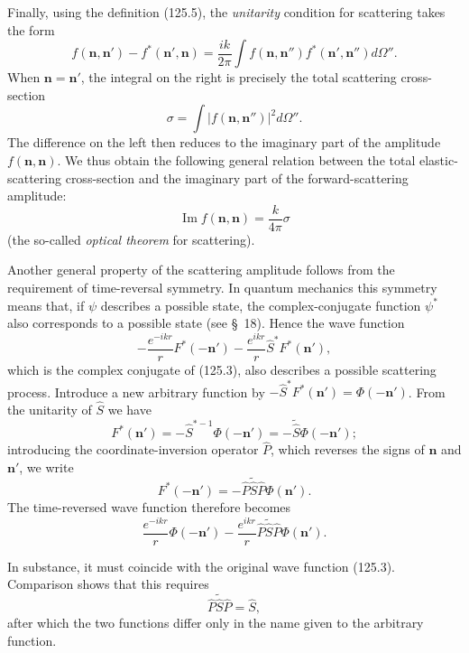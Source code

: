 Finally, using the definition (125.5), the \emph{unitarity} condition for
scattering takes the form
\begin{equation}
 f(\mathbf n,\mathbf n')-f^*(\mathbf n',\mathbf n)
 =\frac{ik}{2\pi}\int f(\mathbf n,\mathbf n'')
 f^*(\mathbf n',\mathbf n'')d\Omega''.
 \tag{125.8}
\end{equation}
When $\mathbf n=\mathbf n'$, the integral on the right is precisely the total
scattering cross-section
\[
 \sigma=\int|f(\mathbf n,\mathbf n'')|^2d\Omega''.
\]
The difference on the left then reduces to the imaginary part of the
amplitude $f(\mathbf n,\mathbf n)$. We thus obtain the following general
relation between the total elastic-scattering cross-section and the imaginary
part of the forward-scattering amplitude:
\begin{equation}
 \operatorname{Im}f(\mathbf n,\mathbf n)=\frac{k}{4\pi}\sigma
 \tag{125.9}
\end{equation}
(the so-called \emph{optical theorem} for scattering).

Another general property of the scattering amplitude follows from the
requirement of time-reversal symmetry. In quantum mechanics this symmetry
means that, if $\psi$ describes a possible state, the complex-conjugate
function $\psi^*$ also corresponds to a possible state (see \S~18). Hence the
wave function
\[
 -\frac{e^{-ikr}}rF^*(-\mathbf n')
 -\frac{e^{ikr}}r\hat S^*F^*(\mathbf n'),
\]
which is the complex conjugate of (125.3), also describes a possible
scattering process. Introduce a new arbitrary function by
$-\hat S^*F^*(\mathbf n')=\Phi(-\mathbf n')$. From the unitarity of $\hat S$
we have
\[
 F^*(\mathbf n')=-\hat S^{*-1}\Phi(-\mathbf n')=-\widetilde{\hat S}
 \Phi(-\mathbf n');
\]
introducing the coordinate-inversion operator $\hat P$, which reverses the
signs of $\mathbf n$ and $\mathbf n'$, we write
\[
 F^*(-\mathbf n')=-\hat P\widetilde{\hat S}\hat P\Phi(\mathbf n').
\]
The time-reversed wave function therefore becomes
\[
 \frac{e^{-ikr}}r\Phi(-\mathbf n')
 -\frac{e^{ikr}}r\hat P\widetilde{\hat S}\hat P\Phi(\mathbf n').
\]

In substance, it must coincide with the original wave function (125.3).
Comparison shows that this requires
\begin{equation}
 \hat P\widetilde{\hat S}\hat P=\hat S,
 \tag{125.10}
\end{equation}
after which the two functions differ only in the name given to the arbitrary
function.

